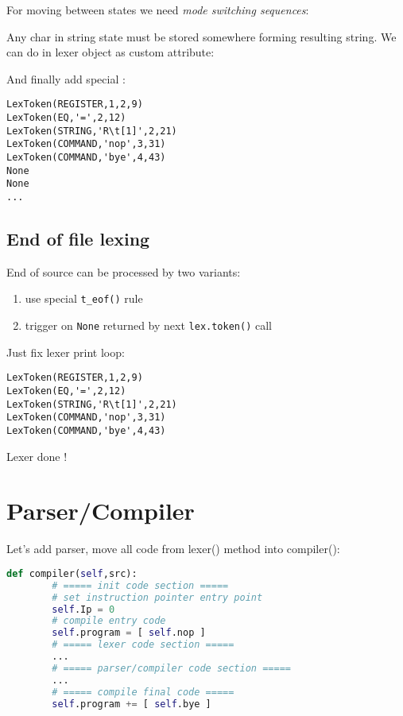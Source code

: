 For moving between states we need \emph{mode switching sequences}:


Any char in string state must be stored somewhere forming resulting string. We
can do in lexer object as custom attribute:


And finally add special :

\begin{lstlisting}
LexToken(REGISTER,1,2,9)
LexToken(EQ,'=',2,12)
LexToken(STRING,'R\t[1]',2,21)
LexToken(COMMAND,'nop',3,31)
LexToken(COMMAND,'bye',4,43)
None
None
...
\end{lstlisting}

\subsection{End of file lexing}

End of source can be processed by two variants:
\begin{enumerate}[nosep]
  \item use special \verb|t_eof()| rule
  \item trigger on \verb|None| returned by next \verb|lex.token()| call 
\end{enumerate}

Just fix lexer print loop:

\begin{lstlisting}
LexToken(REGISTER,1,2,9)
LexToken(EQ,'=',2,12)
LexToken(STRING,'R\t[1]',2,21)
LexToken(COMMAND,'nop',3,31)
LexToken(COMMAND,'bye',4,43)
\end{lstlisting}

\begin{center}{\Huge Lexer done !}\end{center}

\section{Parser/Compiler}

Let's add parser, move all code from lexer() method into compiler():
\begin{lstlisting}[language=python]
	def compiler(self,src):
		# ===== init code section =====
		# set instruction pointer entry point
		self.Ip = 0							
		# compile entry code	
		self.program = [ self.nop ]
		# ===== lexer code section =====
		...
		# ===== parser/compiler code section =====
		...
		# ===== compile final code =====
		self.program += [ self.bye ]
\end{lstlisting}

